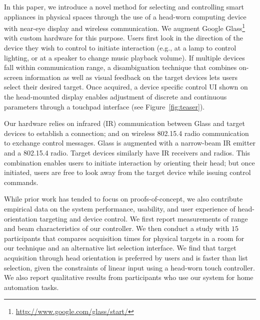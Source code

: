 In this paper, we introduce a novel method for selecting and controlling smart appliances in physical spaces through the use of a head-worn computing device with near-eye display and wireless communication. We augment Google Glass\footnote{\url{http://www.google.com/glass/start/}} with custom hardware for this purpose. Users first look in the direction of the device they wish to control to initiate interaction (e.g., at a lamp to control lighting, or at a speaker to change music playback volume).  If multiple devices fall within communication range, a disambiguation technique that combines on-screen information as well as visual feedback on the target devices lets users select their desired target. Once acquired, a device specific control UI shown on the head-mounted display enables adjustment of discrete and continuous parameters through a touchpad interface (see Figure~\ref{fig:teaser}).

Our hardware relies on infrared (IR) communication between Glass and target devices to establish a connection; and on wireless 802.15.4 radio communication to exchange control messages.  Glass is augmented with a narrow-beam IR emitter and a 802.15.4 radio. Target devices similarly have IR receivers and radios. This combination enables users to initiate interaction by orienting their head; but once initiated, users are free to look away from the target device while issuing control commands.

While prior work has tended to focus on proofs-of-concept, we also contribute empirical data on the system performance, usability, and user experience of  head-orientation targeting and device control. We first report measurements of range and beam characteristics of our controller. We then conduct a study with $15$ participants that compares acquisition times for physical targets in a room for our technique and an alternative list selection interface. We find that target acquisition through head orientation is preferred by users and is faster than list selection, given the constraints of linear input using a head-worn touch controller. We also report qualitative results from participants who use our system for home automation tasks.






